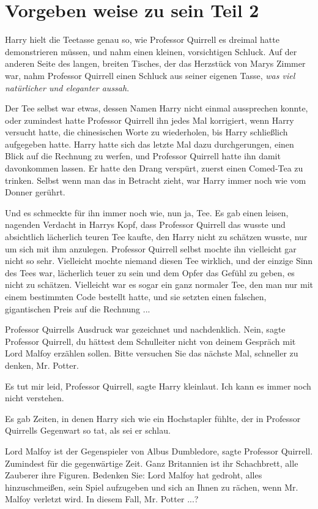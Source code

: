 \chapter{Vorgeben weise zu sein Teil 2}

Harry hielt die Teetasse genau so, wie Professor Quirrell es dreimal hatte
demonstrieren müssen, und nahm einen kleinen, vorsichtigen Schluck. Auf der
anderen Seite des langen, breiten Tisches, der das Herzstück von Marys Zimmer
war, nahm Professor Quirrell einen Schluck aus seiner eigenen Tasse, \emph{was
viel natürlicher und eleganter aussah}.

Der Tee selbst war etwas, dessen Namen Harry nicht einmal aussprechen konnte,
oder zumindest hatte Professor Quirrell ihn jedes Mal korrigiert, wenn Harry
versucht hatte, die chinesischen Worte zu wiederholen, bis Harry schließlich
aufgegeben hatte. Harry hatte sich das letzte Mal dazu durchgerungen, einen
Blick auf die Rechnung zu werfen, und Professor Quirrell hatte ihn damit
davonkommen lassen. Er hatte den Drang verspürt, zuerst einen Comed-Tea zu
trinken. Selbst wenn man das in Betracht zieht, war Harry immer noch wie vom
Donner gerührt.

Und es schmeckte für ihn immer noch wie, nun ja, Tee. Es gab einen leisen,
nagenden Verdacht in Harrys Kopf, dass Professor Quirrell das wusste und
absichtlich lächerlich teuren Tee kaufte, den Harry nicht zu schätzen wusste,
nur um sich mit ihm anzulegen. Professor Quirrell selbst mochte ihn vielleicht
gar nicht so sehr. Vielleicht mochte niemand diesen Tee wirklich, und der
einzige Sinn des Tees war, lächerlich teuer zu sein und dem Opfer das Gefühl zu
geben, es nicht zu schätzen. Vielleicht war es sogar ein ganz normaler Tee, den
man nur mit einem bestimmten Code bestellt hatte, und sie setzten einen
falschen, gigantischen Preis auf die Rechnung ...

Professor Quirrells Ausdruck war gezeichnet und nachdenklich. \glqq{}Nein\grqq{},
sagte Professor Quirrell, \glqq{}du hättest dem Schulleiter nicht von deinem
Gespräch mit Lord Malfoy erzählen sollen. Bitte versuchen Sie das nächste Mal,
schneller zu denken, Mr. Potter.\grqq{}

\glqq{}Es tut mir leid, Professor Quirrell\grqq{}, sagte Harry kleinlaut. \glqq{}
Ich kann es immer noch nicht verstehen.\grqq{}

Es gab Zeiten, in denen Harry sich wie ein Hochstapler fühlte, der in Professor
Quirrells Gegenwart so tat, als sei er schlau.

\glqq{}Lord Malfoy ist der Gegenspieler von Albus Dumbledore\grqq{}, sagte
Professor Quirrell. \glqq{}Zumindest für die gegenwärtige Zeit. Ganz Britannien
ist ihr Schachbrett, alle Zauberer ihre Figuren. Bedenken Sie: Lord Malfoy hat
gedroht, alles hinzuschmeißen, sein Spiel aufzugeben und sich an Ihnen zu
rächen, wenn Mr. Malfoy verletzt wird. In diesem Fall, Mr. Potter ...?\grqq{}

